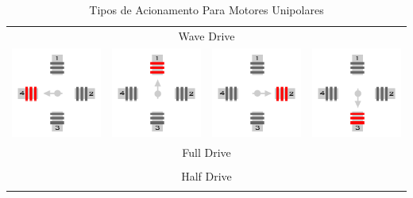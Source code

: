 \begin{table}[H]
	\centering
	\caption{Tipos de Acionamento Para Motores Unipolares}
	\label{Table:AcionamentoUnipolar}
	\begin{tabular}{cccc}
		\multicolumn{4}{c}{Wave Drive}  \\
		\includegraphics[width = 0.15\columnwidth]{Images/AcionamentoDoHSM/Unipolar/WaveDrive/WaveDriveI.png}& \includegraphics[width = 0.15\columnwidth]{Images/AcionamentoDoHSM/Unipolar/WaveDrive/WaveDriveII.png} & \includegraphics[width = 0.15\columnwidth]{Images/AcionamentoDoHSM/Unipolar/WaveDrive/WaveDriveIII.png} & \includegraphics[width = 0.15\columnwidth]{Images/AcionamentoDoHSM/Unipolar/WaveDrive/WaveDriveIV.png} \\
		\multicolumn{4}{c}{Full Drive}  \\
		&  &  &  \\
		\multicolumn{4}{c}{Half Drive} \\
		&  &  &  \\
	\end{tabular}
\end{table} 
